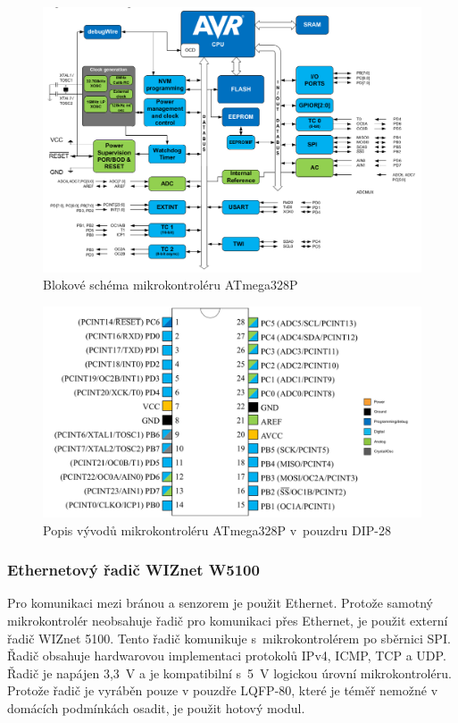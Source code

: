 \documentclass[12pt,a4paper]{article}
\begin{document}
\begin{figure}[H]
\centering
\label{fig:atmega328p-block-diagram}
\includegraphics[width = 128mm]{img/atmega328p-block-diagram.png}
\caption{Blokové schéma mikrokontroléru ATmega328P}
\end{figure}

\begin{figure}[H]
\centering
\label{fig:atmega328p-pinout}
\includegraphics[width = 128mm]{img/atmega328p-pinout.png}
\caption{Popis vývodů mikrokontroléru ATmega328P v~pouzdru DIP-28}
\end{figure}

\newpage

\subsubsection{Ethernetový řadič WIZnet W5100}

Pro komunikaci mezi bránou a senzorem je použit Ethernet. Protože samotný mikrokontrolér neobsahuje řadič pro komunikaci přes Ethernet, je použit externí řadič WIZnet 5100. Tento řadič komunikuje s~mikrokontrolérem po sběrnici SPI. Řadič obsahuje hardwarovou implementaci protokolů IPv4, ICMP, TCP a UDP. Řadič je napájen 3,3~V a je kompatibilní s~5~V logickou úrovní mikrokontroléru. Protože řadič je vyráběn pouze v pouzdře LQFP-80, které je téměř nemožné v domácích podmínkách osadit, je použit hotový modul.
\end{document}

